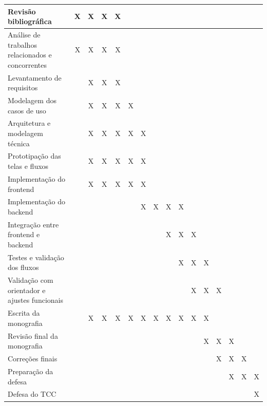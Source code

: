 \documentclass[a4paper, 12pt]{article}
\begin{document}
\begin{justify}
\begin{table}[H]
{\begin{tabular}{|l|c|c|c|c|c|c|c|c|c|c|c|c|c|c|c|}
Revisão bibliográfica 
& X & X & X & X &  &  &  &  &  &  &  &  &  &  &  \\
\hline

Análise de trabalhos relacionados e concorrentes 
& X & X & X & X &  &  &  &  &  &  &  &  &  &  &  \\
\hline

Levantamento de requisitos 
&  & X & X & X &  &  &  &  &  &  &  &  &  &  &  \\
\hline

Modelagem dos casos de uso 
&  & X & X & X & X &  &  &  &  &  &  &  &  &  &  \\
\hline

Arquitetura e modelagem técnica 
&  & X & X & X & X & X &  &  &  &  &  &  &  &  &  \\
\hline

Prototipação das telas e fluxos 
&  & X & X & X & X & X &  &  &  &  &  &  &  &  &  \\
\hline

Implementação do frontend 
&  & X & X & X & X & X &  &  &  &  &  &  &  &  &  \\
\hline

Implementação do backend 
&  &  &  &  &  & X & X & X & X &  &  &  &  &  &  \\
\hline

Integração entre frontend e backend 
&  &  &  &  &  &  &  & X & X & X &  &  &  &  &  \\
\hline

Testes e validação dos fluxos 
&  &  &  &  &  &  &  &  & X & X & X &  &  &  &  \\
\hline

Validação com orientador e ajustes funcionais 
&  &  &  &  &  &  &  &  &  & X & X & X &  &  &  \\
\hline

Escrita da monografia 
&  & X & X & X & X & X & X & X & X & X & X &  &  &  &  \\
\hline

Revisão final da monografia 
&  &  &  &  &  &  &  &  &  &  & X & X & X &  &  \\
\hline

Correções finais 
&  &  &  &  &  &  &  &  &  &  &  & X & X & X &  \\
\hline

Preparação da defesa 
&  &  &  &  &  &  &  &  &  &  &  &  & X & X & X \\
\hline

Defesa do TCC 
&  &  &  &  &  &  &  &  &  &  &  &  &  &  & X \\
\hline


\end{tabular}}
\end{table}
\end{justify}
\end{document}
